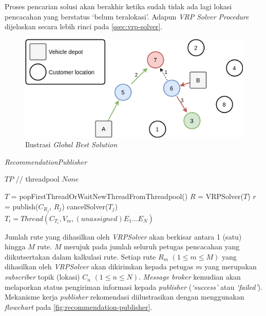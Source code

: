 Proses pencarian solusi akan berakhir ketika sudah tidak ada lagi lokasi pencacahan yang berstatus `belum teralokasi'. Adapun \textit{VRP Solver Procedure} dijelaskan secara lebih rinci pada \autoref{ssec:vrp-solver}.


\begin{figure}[!]
	\centering
	\includegraphics[width=12cm]{Resources/Images/global-best-greedy-solution}
	\captionsetup{format=hang}
	\caption{Ilustrasi \textit{Global Best Solution}}
	\label{fig:global-best-greedy-solution}
\end{figure}


\begin{algorithm}[!]
	\captionsetup{format=hang}
	\caption{\textit{RecommendationPublisher}}
	\label{alg:vrp-worker}
	\begin{algorithmic}[1]
		\renewcommand{\algorithmicrequire}{\textbf{Input:}}
		\renewcommand{\algorithmicensure}{\textbf{Output:}}
		\REQUIRE $TP$		// threadpool
		\ENSURE  $None$
		
		\STATE $T$ = popFirstThreadOrWaitNewThreadFromThreadpool()
		\STATE $R$ = VRPSolver($T$)
		\STATE $r$ = publish($C_{R_j}$, $R_j$)
		\STATE cancelSolver($T_j$)
		\STATE $T_i = Thread(C_{T_i}, V_m, (unassigned) E_1...E_N)$
		\ENDIF
		\ENDFOR
		\ENDWHILE	
	\end{algorithmic}
\end{algorithm}


Jumlah rute yang dihasilkan oleh \textit{VRPSolver} akan berkisar antara 1 (satu) hingga $M$ rute. $M$ merujuk pada jumlah seluruh petugas pencacahan yang diikutsertakan dalam kalkulasi rute. Setiap rute $R_m$ $(1 \leq m \leq M)$ yang dihasilkan oleh \textit{VRPSolver} akan dikirimkan kepada petugas $m$ yang merupakan \textit{subscriber} topik (lokasi) $C_n$ $(1 \leq n \leq N)$. \textit{Message broker} kemudian akan melaporkan status pengiriman informasi kepada \textit{publisher} (\textit{`success'} atau \textit{`failed'}). Mekanisme kerja \textit{publisher} rekomendasi diilustrasikan dengan menggunakan \textit{flowchart} pada \autoref{fig:recommendation-publisher}.


